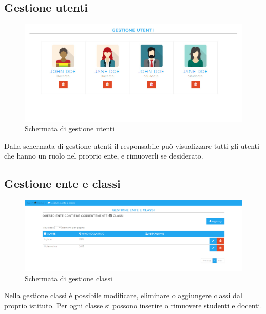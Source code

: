\documentclass[a4paper, titlepage]{article}
\begin{document}
	 \subsection{Gestione utenti}
	 \begin{figure}[!h]
	 	\centering
	 	\includegraphics[scale=0.33]{Img/screen_GestioneUtenti.png}
	 	\caption{Schermata di gestione utenti}
	 \end{figure}
	 Dalla schermata di gestione utenti il responsabile può visualizzare tutti gli utenti che hanno un ruolo nel proprio ente, e rimuoverli se desiderato.
	 
	 \subsection{Gestione ente e classi}
	 \begin{figure}[!h]
	 	\centering
	 	\includegraphics[scale=0.33]{Img/screen_GestioneEnteClassi.png}
	 	\caption{Schermata di gestione classi}
	 \end{figure}

	 Nella gestione classi è possibile modificare, eliminare o aggiungere classi dal proprio istituto. Per ogni classe si possono inserire o rimuovere studenti e docenti.
	 
	 \newpage
\end{document}
